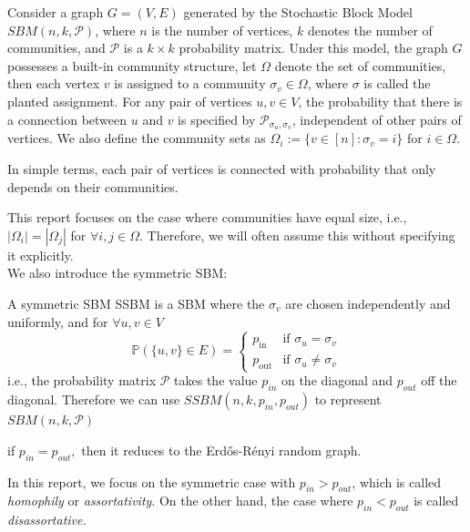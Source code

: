 \begin{definition}
Consider a graph $G=(V, E)$ generated by the Stochastic Block Model $SBM(n, k, \mathcal{P})$, where $n$ is the number of vertices, $k$ denotes the number of communities, and $\mathcal{P}$ is a $k\times k$ probability matrix. Under this model, the graph $G$ possesses a built-in community structure, let $\Omega$ denote the set of communities, then each vertex $v$ is assigned to a community $\sigma_v\in\Omega$, where $\sigma$ is called the planted assignment. For any pair of vertices $u, v \in V$, the probability that there is a connection between $u$ and $v$ is specified by $\mathcal{P}_{\sigma_u, \sigma_v}$, independent of other pairs of vertices. We also define the community sets as $\Omega_i:=\{v\in[n]: \sigma_v=i\}$ for $i\in\Omega$.
\end{definition}
\begin{remark}
    In simple terms, each pair of vertices is connected with probability that only depends on their communities. 
\end{remark}
This report focuses on the case where communities have equal size, i.e., $|\Omega_i|=|\Omega_j|$ for $\forall i, j\in\Omega.$ Therefore, we will often assume this without specifying it explicitly.\\

We also introduce the symmetric SBM:
\vspace{-2mm}
\begin{definition}
A symmetric SBM SSBM is a SBM where the $\sigma_v$ are chosen independently and uniformly,  and for $\forall u, v\in V$ \begin{equation}
\mathbb{P}\left(\{u,v\}\in E\right) = 
    \begin{cases} 
    p_{\text{in}} & \text{if } \sigma_u = \sigma_v \\
    p_{\text{out}} & \text{if } \sigma_u \neq \sigma_v 
    \end{cases}
\end{equation}
i.e., the probability matrix $\mathcal{P}$ takes the value $p_{in}$ on the diagonal and $p_{out}$ off the diagonal. Therefore we can use $SSBM(n, k, p_{in}, p_{out})$ to represent $SBM(n, k, \mathcal{P})$
\end{definition}
\begin{remark}
    if $p_{in}=p_{out},$ then it reduces to the Erd\H{o}s-R\'{e}nyi random graph.
\end{remark}
In this report, we focus on the symmetric case with $p_{in}>p_{out}$, which is called \textit{homophily} or \textit{assortativity}. On the other hand, the case where $p_{in}<p_{out}$ is called \textit{disassortative.}\\

